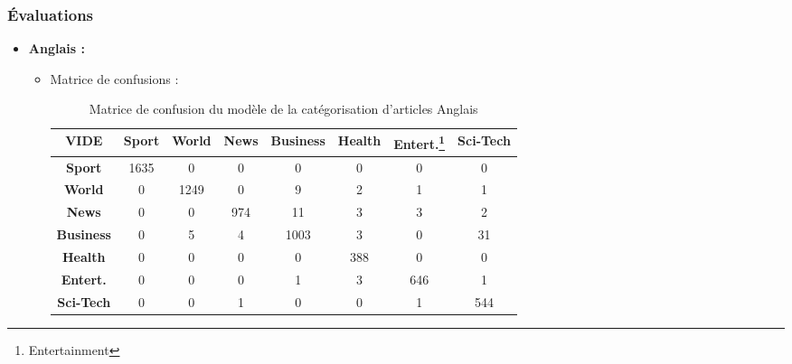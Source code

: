         \subsubsection{Évaluations}
        \begin{itemize}
            \item{\textbf{Anglais :} }
            \begin{itemize}
                \item{Matrice de confusions : }
                \begin{table}[H]
                    \begin{center}
                        \begin{tabular}{|c|c|c|c|c|c|c|c|}
                            \hline
                            \textbf{VIDE} & \textbf{Sport} &  \textbf{World} &  \textbf{News} &  \textbf{Business} &  \textbf{Health} & \textbf{Entert.\footnote{Entertainment}} &  \textbf{Sci-Tech} \\
                            \hline
                            \textbf{Sport} & 1635 & 0 & 0 & 0 & 0 & 0 & 0 \\
                            \hline
                            \textbf{World}  & 0 & 1249 & 0 & 9 & 2 & 1 & 1 \\
                            \hline
                            \textbf{News}  & 0 & 0 & 974 & 11 & 3 & 3 & 2 \\
                            \hline
                            \textbf{Business}  & 0 & 5 & 4 & 1003 & 3 & 0 & 31 \\
                            \hline
                            \textbf{Health}  & 0 & 0 & 0 & 0 & 388 & 0 & 0 \\
                            \hline
                            \textbf{Entert.}  & 0 & 0 & 0 & 1 & 3 & 646 & 1 \\
                            \hline
                            \textbf{Sci-Tech}  & 0 & 0 & 1 & 0 & 0 & 1 & 544 \\
                            \hline
                        \end{tabular}
                    \end{center}
                    \caption{Matrice de confusion du modèle de la catégorisation d'articles Anglais}
                \end{table}

\end{itemize}
\end{itemize}
